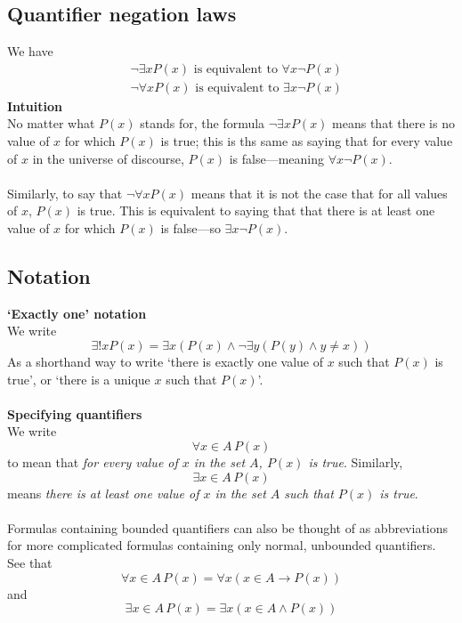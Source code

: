 \documentclass{report}
\theoremstyle{definition}
\begin{document}
\subsection{Quantifier negation laws}
We have
\begin{align*}
&\neg\exists xP(x)\text{ is equivalent to }\forall x\neg P(x)\\
&\neg\forall xP(x)\text{ is equivalent to }\exists x\neg P(x)
\end{align*}
\textbf{Intuition}\\
No matter what $P(x)$ stands for, the formula $\neg\exists xP(x)$ means that there is no value of $x$ for which $P(x)$ is true; this is ths same as saying that for every value of $x$ in 
the universe of discourse, $P(x)$ is false---meaning $\forall x\neg P(x)$.\\
\vspace{1mm}\\
Similarly, to say that $\neg\forall xP(x)$ means that it is not the case that for all values of $x$, $P(x)$ is true. This is equivalent to saying that that there is at least one
value of $x$ for which $P(x)$ is false---so $\exists x\neg P(x)$.

\subsection{Notation}
\textbf{`Exactly one' notation}\\
We write 
\begin{equation*}
\exists!xP(x)=\exists x(P(x)\land\neg\exists y(P(y)\land y\neq x))
\end{equation*}
As a shorthand way to write `there is exactly one value of $x$ such that $P(x)$ is true', or `there is a unique $x$ such that $P(x)$'.\\
\vspace{1mm}\\
\textbf{Specifying quantifiers}\\
We write
\begin{equation*}
\forall x\in A\, P(x)
\end{equation*}
to mean that \textit{for every value of $x$ in the set $A$, $P(x)$ is true}. Similarly,
\begin{equation*}
\exists x\in A\, P(x)
\end{equation*}
means \textit{there is at least one value of $x $ in the set $A$ such that $P(x)$ is true}.\\
\vspace{1mm}\\
Formulas containing bounded quantifiers can also be thought of as abbreviations for more complicated formulas containing only normal, unbounded quantifiers. See that 
\begin{equation*}
\forall x\in A\, P(x)=\forall x(x\in A\to P(x))
\end{equation*}
and
\begin{equation*}
\exists x\in A\,P(x)=\exists x(x\in A\land P(x))
\end{equation*}
\newpage
\end{document}
